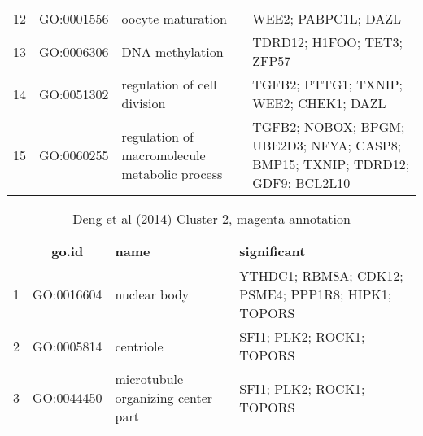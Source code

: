 \begin{table}[htp]
\begin{center}
\begin{tabular}{|c|c|p{1.5in}|p{4in}|}
  12 & GO:0001556 & oocyte maturation & \footnotesize{WEE2; PABPC1L; DAZL} \\ 
  13 & GO:0006306 & DNA methylation & \footnotesize{TDRD12; H1FOO; TET3; ZFP57} \\ 
  14 & GO:0051302 & regulation of cell division & \footnotesize{TGFB2; PTTG1; TXNIP; WEE2; CHEK1; DAZL} \\ 
  15 & GO:0060255 & regulation of macromolecule metabolic process & \footnotesize{TGFB2; NOBOX; BPGM; UBE2D3; NFYA; CASP8; BMP15; TXNIP; TDRD12; GDF9; BCL2L10} \\ 
 \hline
\end{tabular}
\end{center} \label{tab:tab9}
  \end{table}

\begin{table}[htp]
\begin{center}
\caption{Deng et al (2014) Cluster 2, magenta annotation} \label{tab:tab10}
\begin{tabular}{|c|c|p{1.5in}|p{4in}|}
  \hline
 & go.id & name  & significant \\ 
  \hline
1 & GO:0016604 & nuclear body  & \footnotesize{YTHDC1; RBM8A; CDK12; PSME4; PPP1R8; HIPK1; TOPORS} \\ 
  2 & GO:0005814 & centriole  & \footnotesize{SFI1; PLK2; ROCK1; TOPORS} \\ 
  3 & GO:0044450 & microtubule organizing center part  & \footnotesize{SFI1; PLK2; ROCK1; TOPORS} \\ 
   \hline
\end{tabular}
 \end{center} \label{tab:tab10}
  \end{table}


